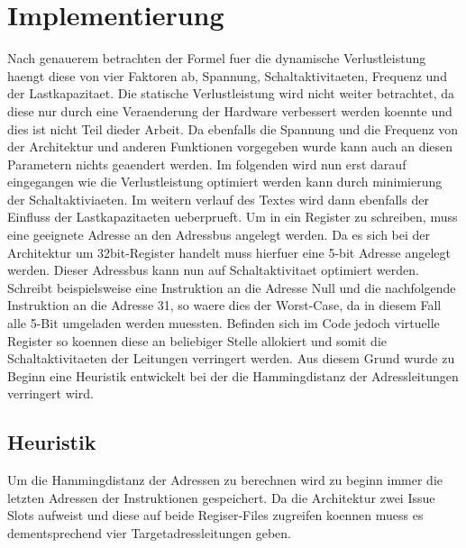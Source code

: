 \chapter{Implementierung}
\label{chap:Implementierung}

Nach genauerem betrachten der Formel fuer die dynamische Verlustleistung haengt diese von vier Faktoren ab, Spannung, Schaltaktivitaeten, Frequenz und der Lastkapazitaet. Die statische Verlustleistung wird nicht weiter betrachtet, da diese nur durch eine Veraenderung der Hardware verbessert werden koennte und dies ist nicht Teil dieder Arbeit. Da ebenfalls die Spannung und die Frequenz von der Architektur und anderen Funktionen vorgegeben wurde kann auch an diesen Parametern nichts geaendert werden. Im folgenden wird nun erst darauf eingegangen wie die Verlustleistung optimiert werden kann durch minimierung der Schaltaktiviaeten. Im weitern verlauf des Textes wird dann ebenfalls der Einfluss der Lastkapazitaeten ueberprueft.
Um in ein Register zu schreiben, muss eine geeignete Adresse an den Adressbus angelegt werden. Da es sich bei der Architektur um 32bit-Register handelt muss hierfuer eine 5-bit Adresse angelegt werden. Dieser Adressbus kann nun auf Schaltaktivitaet optimiert werden. Schreibt beispielsweise eine Instruktion an die Adresse Null und die nachfolgende Instruktion an die Adresse 31, so waere dies der Worst-Case, da in diesem Fall alle 5-Bit umgeladen werden muessten. Befinden sich im Code jedoch virtuelle Register so koennen diese an beliebiger Stelle allokiert und somit die Schaltaktivitaeten der Leitungen verringert werden. Aus diesem Grund wurde zu Beginn eine Heuristik entwickelt bei der die Hammingdistanz der Adressleitungen verringert wird.
\section{Heuristik}
\label{sec:Heuristik}
Um die Hammingdistanz der Adressen zu berechnen wird zu beginn immer die letzten Adressen der Instruktionen gespeichert. Da die Architektur zwei Issue Slots aufweist und diese auf beide Regiser-Files zugreifen koennen muess es dementsprechend vier Targetadressleitungen geben.
